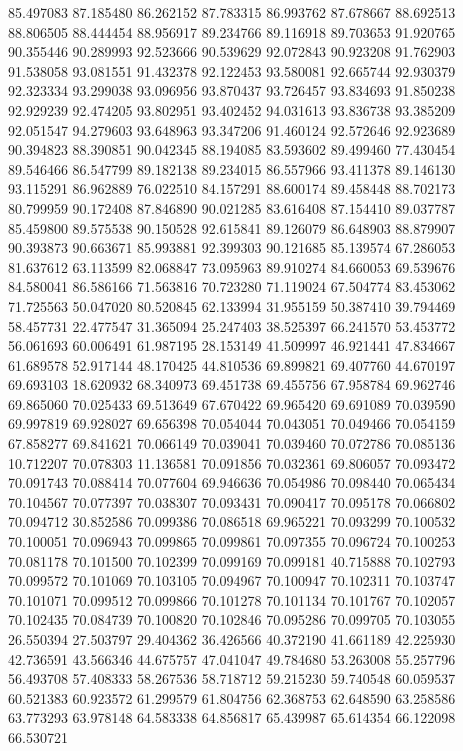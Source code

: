85.497083
87.185480
86.262152
87.783315
86.993762
87.678667
88.692513
88.806505
88.444454
88.956917
89.234766
89.116918
89.703653
91.920765
90.355446
90.289993
92.523666
90.539629
92.072843
90.923208
91.762903
91.538058
93.081551
91.432378
92.122453
93.580081
92.665744
92.930379
92.323334
93.299038
93.096956
93.870437
93.726457
93.834693
91.850238
92.929239
92.474205
93.802951
93.402452
94.031613
93.836738
93.385209
92.051547
94.279603
93.648963
93.347206
91.460124
92.572646
92.923689
90.394823
88.390851
90.042345
88.194085
83.593602
89.499460
77.430454
89.546466
86.547799
89.182138
89.234015
86.557966
93.411378
89.146130
93.115291
86.962889
76.022510
84.157291
88.600174
89.458448
88.702173
80.799959
90.172408
87.846890
90.021285
83.616408
87.154410
89.037787
85.459800
89.575538
90.150528
92.615841
89.126079
86.648903
88.879907
90.393873
90.663671
85.993881
92.399303
90.121685
85.139574
67.286053
81.637612
63.113599
82.068847
73.095963
89.910274
84.660053
69.539676
84.580041
86.586166
71.563816
70.723280
71.119024
67.504774
83.453062
71.725563
50.047020
80.520845
62.133994
31.955159
50.387410
39.794469
58.457731
22.477547
31.365094
25.247403
38.525397
66.241570
53.453772
56.061693
60.006491
61.987195
28.153149
41.509997
46.921441
47.834667
61.689578
52.917144
48.170425
44.810536
69.899821
69.407760
44.670197
69.693103
18.620932
68.340973
69.451738
69.455756
67.958784
69.962746
69.865060
70.025433
69.513649
67.670422
69.965420
69.691089
70.039590
69.997819
69.928027
69.656398
70.054044
70.043051
70.049466
70.054159
67.858277
69.841621
70.066149
70.039041
70.039460
70.072786
70.085136
10.712207
70.078303
11.136581
70.091856
70.032361
69.806057
70.093472
70.091743
70.088414
70.077604
69.946636
70.054986
70.098440
70.065434
70.104567
70.077397
70.038307
70.093431
70.090417
70.095178
70.066802
70.094712
30.852586
70.099386
70.086518
69.965221
70.093299
70.100532
70.100051
70.096943
70.099865
70.099861
70.097355
70.096724
70.100253
70.081178
70.101500
70.102399
70.099169
70.099181
40.715888
70.102793
70.099572
70.101069
70.103105
70.094967
70.100947
70.102311
70.103747
70.101071
70.099512
70.099866
70.101278
70.101134
70.101767
70.102057
70.102435
70.084739
70.100820
70.102846
70.095286
70.099705
70.103055
26.550394
27.503797
29.404362
36.426566
40.372190
41.661189
42.225930
42.736591
43.566346
44.675757
47.041047
49.784680
53.263008
55.257796
56.493708
57.408333
58.267536
58.718712
59.215230
59.740548
60.059537
60.521383
60.923572
61.299579
61.804756
62.368753
62.648590
63.258586
63.773293
63.978148
64.583338
64.856817
65.439987
65.614354
66.122098
66.530721
